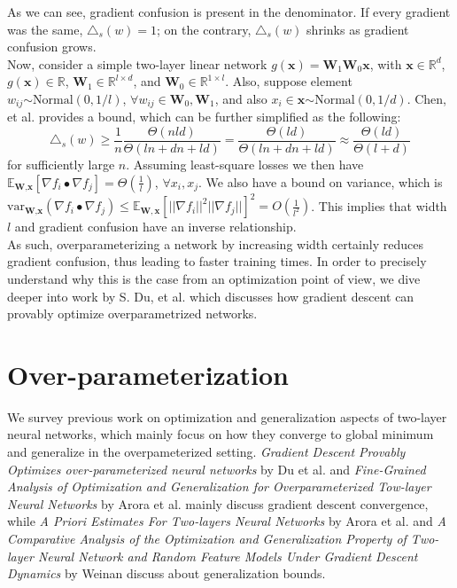 \documentclass{article}
\begin{document}
As we can see, gradient confusion is present in the denominator. If every gradient was the same, $\triangle_s(w) = 1$; on the contrary, $\triangle_s(w)$ shrinks as gradient confusion grows. \\

Now, consider a simple two-layer linear network $g(\textbf{x}) = \textbf{W}_1 \textbf{W}_0 \textbf{x}$, with $\textbf{x} \in \mathbb{R}^d$, $g(\textbf{x}) \in \mathbb{R}$, $\textbf{W}_1 \in \mathbb{R}^{l \times d}$, and $\textbf{W}_0 \in \mathbb{R}^{1 \times l}$. Also, suppose element $w_{ij} \stackrel{}{\sim} \text{Normal}(0, 1/l)$, $\forall w_{ij} \in \textbf{W}_0, \textbf{W}_1$, and also $x_i \in \textbf{x} \stackrel{}{\sim} \text{Normal}(0, 1/d)$. Chen, et al. \cite{chen} provides a bound, which can be further simplified as the following:
$$ \triangle_s(w) \geq \frac{1}{n} \frac{\Theta (nld)}{\Theta (ln + dn + ld)} = \frac{\Theta(ld)}{\Theta(ln + dn + ld)} \approx \frac{\Theta(ld)}{\Theta(l + d)}$$ 
for sufficiently large $n$. Assuming least-square losses we then have $\mathbb{E}_{\textbf{W}, \textbf{x}}[\nabla f_i \bullet \nabla f_j] = \Theta(\frac{1}{l})$, $\forall x_i, x_j$. We also have a bound on variance, which is $\text{var}_{\textbf{W}, \textbf{x}}(\nabla f_i \bullet \nabla f_j) \leq \mathbb{E}_{\mathbf{W}, \mathbf{x}} [||\nabla f_i||^2 ||\nabla f_j||]^2 = O(\frac{1}{l^2})$. This implies that width $l$ and gradient confusion have an inverse relationship.\\

As such, overparameterizing a network by increasing width certainly reduces gradient confusion, thus leading to faster training times. In order to precisely understand why this is the case from an optimization point of view, we dive deeper into work by S. Du, et al. which discusses how gradient descent can provably optimize overparametrized networks.

\section{Over-parameterization}
We survey previous work on optimization and generalization aspects of two-layer neural networks, which mainly focus on how they converge to global minimum and generalize in the overpameterized setting. \textsl{Gradient Descent Provably Optimizes over-parameterized neural networks} by Du et al. and \textsl{Fine-Grained Analysis of Optimization and Generalization for Overparameterized Tow-layer Neural Networks} by Arora et al. mainly discuss gradient descent convergence, while \textsl{A Priori Estimates For Two-layers Neural Networks} by Arora et al. and \textsl{A Comparative Analysis of the Optimization and Generalization Property of Two-layer Neural Network and Random Feature Models Under Gradient Descent Dynamics} by Weinan discuss about generalization bounds. 
\end{document}
